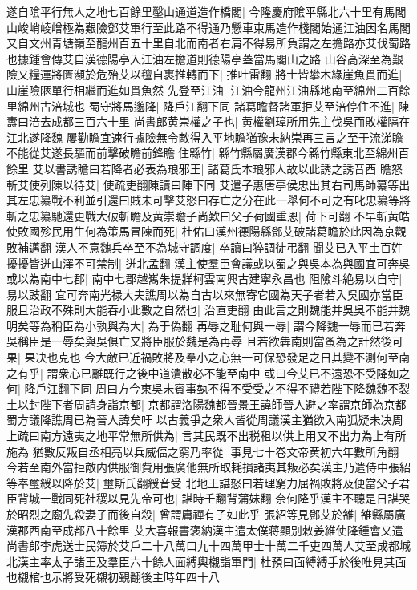 遂自隂平行無人之地七百餘里鑿山通道造作橋閣|{
	今隆慶府隂平縣北六十里有馬閣山峻峭崚嶒極為艱險鄧艾軍行至此路不得通乃懸車束馬造作棧閣始通江油因名馬閣又自文州青塘嶺至龍州百五十里自北而南者右肩不得易所負謂之左擔路亦艾伐蜀路也據鍾會傳艾自漢德陽亭入江油左擔道則德陽亭蓋當馬閣山之路}
山谷高深至為艱險又糧運將匱瀕於危殆艾以氊自裹推轉而下|{
	推吐雷翻}
將士皆攀木緣崖魚貫而進|{
	山崖險陿單行相繼而進如貫魚然}
先登至江油|{
	江油今龍州江油縣地南至綿州二百餘里綿州古涪城也}
蜀守將馬邈降|{
	降戶江翻下同}
諸葛瞻督諸軍拒艾至涪停住不進|{
	陳夀曰涪去成都三百六十里}
尚書郎黄崇權之子也|{
	黄權劉璋所用先主伐吳而敗權隔在江北遂降魏}
屢勸瞻宜速行據險無令敵得入平地瞻猶豫未納崇再三言之至于流涕瞻不能從艾遂長驅而前擊破瞻前鋒瞻住緜竹|{
	緜竹縣屬廣漢郡今緜竹縣東北至綿州百餘里}
艾以書誘瞻曰若降者必表為琅邪王|{
	諸葛氏本琅邪人故以此誘之誘音酉}
瞻怒斬艾使列陳以待艾|{
	使疏吏翻陳讀曰陣下同}
艾遣子惠唐亭侯忠出其右司馬師纂等出其左忠纂戰不利並引還曰賊未可擊艾怒曰存亡之分在此一舉何不可之有叱忠纂等將斬之忠纂馳還更戰大破斬瞻及黄崇瞻子尚歎曰父子荷國重恩|{
	荷下可翻}
不早斬黄皓使敗國殄民用生何為策馬冒陳而死|{
	杜佑曰漢州德陽縣鄧艾破諸葛瞻於此因為京觀敗補邁翻}
漢人不意魏兵卒至不為城守調度|{
	卒讀曰猝調徒弔翻}
聞艾已入平土百姓擾擾皆迸山澤不可禁制|{
	迸北孟翻}
漢主使羣臣會議或以蜀之與吳本為與國宜可奔吳或以為南中七郡|{
	南中七郡越嶲朱提牂柯雲南興古建寧永昌也}
阻險斗絶易以自守|{
	易以豉翻}
宜可奔南光禄大夫譙周以為自古以來無寄它國為天子者若入吳國亦當臣服且治政不殊則大能吞小此數之自然也|{
	治直吏翻}
由此言之則魏能并吳吳不能并魏明矣等為稱臣為小孰與為大|{
	為于偽翻}
再辱之耻何與一辱|{
	謂今降魏一辱而已若奔吳稱臣是一辱矣與吳俱亡又將臣服於魏是為再辱}
且若欲犇南則當蚤為之計然後可果|{
	果决也克也}
今大敵已近禍敗將及羣小之心無一可保恐發足之日其變不測何至南之有乎|{
	謂衆心已離既行之後中道潰散必不能至南中}
或曰今艾已不遠恐不受降如之何|{
	降戶江翻下同}
周曰方今東吳未賓事埶不得不受受之不得不禮若陛下降魏魏不裂土以封陛下者周請身詣京都|{
	京都謂洛陽魏都晉景王諱師晉人避之率謂京師為京都蜀方議降譙周已為晉人諱矣吁}
以古義爭之衆人皆從周議漢主猶欲入南狐疑未决周上疏曰南方遠夷之地平常無所供為|{
	言其民既不出税租以供上用又不出力為上有所施為}
猶數反叛自丞相亮以兵威偪之窮乃率從|{
	事見七十卷文帝黄初六年數所角翻}
今若至南外當拒敵内供服御費用張廣他無所取耗損諸夷其叛必矣漢主乃遣侍中張紹等奉璽綬以降於艾|{
	璽斯氏翻綬音受}
北地王諶怒曰若理窮力屈禍敗將及便當父子君臣背城一戰同死社稷以見先帝可也|{
	諶時壬翻背蒲妹翻}
奈何降乎漢主不聽是日諶哭於昭烈之廟先殺妻子而後自殺|{
	曾謂庸禪有子如此乎}
張紹等見鄧艾於雒|{
	雒縣屬廣漢郡西南至成都八十餘里}
艾大喜報書褒納漢主遣太僕蒋顯别敕姜維使降鍾會又遣尚書郎李虎送士民簿於艾戶二十八萬口九十四萬甲士十萬二千吏四萬人艾至成都城北漢主率太子諸王及羣臣六十餘人面縛輿櫬詣軍門|{
	杜預曰面縛縛手於後唯見其面也櫬棺也示將受死櫬初覲翻後主時年四十八}
